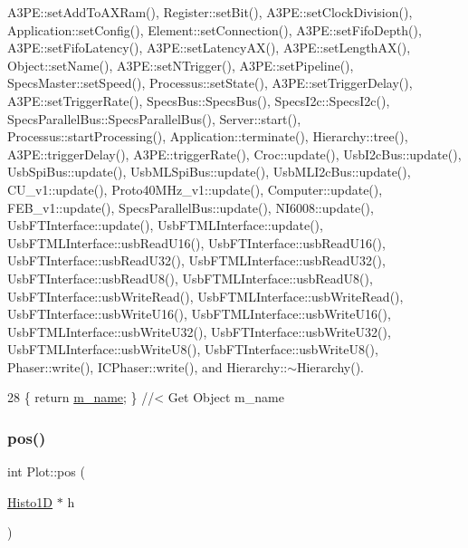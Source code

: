 A3\+P\+E\+::set\+Add\+To\+A\+X\+Ram(), Register\+::set\+Bit(), A3\+P\+E\+::set\+Clock\+Division(), Application\+::set\+Config(), Element\+::set\+Connection(), A3\+P\+E\+::set\+Fifo\+Depth(), A3\+P\+E\+::set\+Fifo\+Latency(), A3\+P\+E\+::set\+Latency\+A\+X(), A3\+P\+E\+::set\+Length\+A\+X(), Object\+::set\+Name(), A3\+P\+E\+::set\+N\+Trigger(), A3\+P\+E\+::set\+Pipeline(), Specs\+Master\+::set\+Speed(), Processus\+::set\+State(), A3\+P\+E\+::set\+Trigger\+Delay(), A3\+P\+E\+::set\+Trigger\+Rate(), Specs\+Bus\+::\+Specs\+Bus(), Specs\+I2c\+::\+Specs\+I2c(), Specs\+Parallel\+Bus\+::\+Specs\+Parallel\+Bus(), Server\+::start(), Processus\+::start\+Processing(), Application\+::terminate(), Hierarchy\+::tree(), A3\+P\+E\+::trigger\+Delay(), A3\+P\+E\+::trigger\+Rate(), Croc\+::update(), Usb\+I2c\+Bus\+::update(), Usb\+Spi\+Bus\+::update(), Usb\+M\+L\+Spi\+Bus\+::update(), Usb\+M\+L\+I2c\+Bus\+::update(), C\+U\+\_\+v1\+::update(), Proto40\+M\+Hz\+\_\+v1\+::update(), Computer\+::update(), F\+E\+B\+\_\+v1\+::update(), Specs\+Parallel\+Bus\+::update(), N\+I6008\+::update(), Usb\+F\+T\+Interface\+::update(), Usb\+F\+T\+M\+L\+Interface\+::update(), Usb\+F\+T\+M\+L\+Interface\+::usb\+Read\+U16(), Usb\+F\+T\+Interface\+::usb\+Read\+U16(), Usb\+F\+T\+Interface\+::usb\+Read\+U32(), Usb\+F\+T\+M\+L\+Interface\+::usb\+Read\+U32(), Usb\+F\+T\+Interface\+::usb\+Read\+U8(), Usb\+F\+T\+M\+L\+Interface\+::usb\+Read\+U8(), Usb\+F\+T\+Interface\+::usb\+Write\+Read(), Usb\+F\+T\+M\+L\+Interface\+::usb\+Write\+Read(), Usb\+F\+T\+Interface\+::usb\+Write\+U16(), Usb\+F\+T\+M\+L\+Interface\+::usb\+Write\+U16(), Usb\+F\+T\+M\+L\+Interface\+::usb\+Write\+U32(), Usb\+F\+T\+Interface\+::usb\+Write\+U32(), Usb\+F\+T\+M\+L\+Interface\+::usb\+Write\+U8(), Usb\+F\+T\+Interface\+::usb\+Write\+U8(), Phaser\+::write(), I\+C\+Phaser\+::write(), and Hierarchy\+::$\sim$\+Hierarchy().


\begin{DoxyCode}
28 \{ \textcolor{keywordflow}{return} \hyperlink{classObject_a8b83c95c705d2c3ba0d081fe1710f48d}{m\_name}; \} \textcolor{comment}{//< Get Object m\_name}
\end{DoxyCode}
\mbox{\label{classPlot_a3f7d4915b045844af0773d09d0c185ad}} 
\subsubsection{\texorpdfstring{pos()}{pos()}}
{\footnotesize\ttfamily int Plot\+::pos (\begin{DoxyParamCaption}\item[{\hyperlink{classHisto1D}{Histo1D} $\ast$}]{h }\end{DoxyParamCaption})\hspace{0.3cm}{\ttfamily [inline]}}



